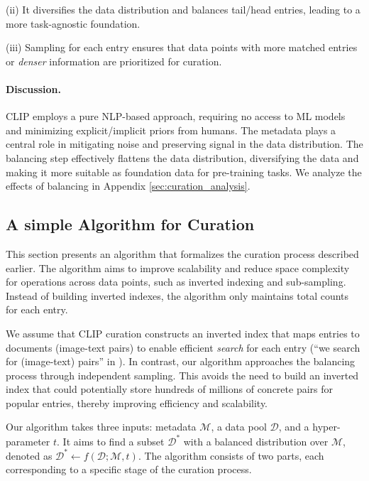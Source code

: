 \documentclass{article} %
\begin{document}
(ii) It diversifies the data distribution and balances tail/head entries, leading to a more task-agnostic foundation.

(iii) Sampling for each entry ensures that data points with more matched entries or \textit{denser} information are prioritized for curation.

\paragraph{Discussion.}
CLIP employs a pure NLP-based approach, requiring no access to ML models and minimizing  explicit/implicit priors from humans. The metadata plays a central role in mitigating noise and preserving signal in the data distribution. The balancing step effectively flattens the data distribution, diversifying the data and making it more suitable as foundation data for pre-training tasks. We analyze the effects of balancing in Appendix \ref{sec:curation_analysis}.

\subsection{A simple Algorithm for Curation}

This section presents an algorithm that formalizes the curation process described earlier. The algorithm aims to improve scalability and reduce space complexity for operations across data points, such as inverted indexing and sub-sampling. Instead of building inverted indexes, the algorithm only maintains total counts for each entry. 

We assume that CLIP curation constructs an inverted index that maps entries to documents (image-text pairs) to enable efficient \textit{search} for each entry (``we search for (image-text) pairs'' in \cite{radford2021learning}). In contrast, our algorithm approaches the balancing process through independent sampling. This avoids the need to build an inverted index that could potentially store hundreds of millions of concrete pairs for popular entries, thereby improving efficiency and scalability.

Our algorithm takes three inputs: metadata $\mathcal{M}$, a data pool $\mathcal{D}$, and a hyper-parameter $t$. It aims to find a subset $\mathcal{D}^*$ with a balanced distribution over $\mathcal{M}$, denoted as $\mathcal{D}^* \leftarrow f(\mathcal{D}; \mathcal{M}, t)$. The algorithm consists of two parts, each corresponding to a specific stage of the curation process. 
\end{document}
